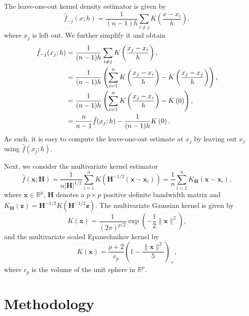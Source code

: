 \documentclass[11pt,a4paper,]{article}
\theoremstyle{definition}
\theoremstyle{definition}
\theoremstyle{definition}
\theoremstyle{remark}
\begin{document}
The leave-one-out kernel density estimator is given by
\begin{equation}\label{eq:kde9}
    \hat{f}_{-j}(x;h) = \frac{1}{(n-1)h}\sum_{i \neq j} K\left(\frac{x-x_i}{h}\right) ,
\end{equation}
where \(x_j\) is left out. We further simplify it and obtain
\begin{align}\label{eq:kde10}
    \hat{f}_{-j}(x_j;h)
      & = \frac{1}{(n-1)h}\sum_{i \neq j} K\left(\frac{x_j-x_i}{h}\right) , \notag                                                  \\
      & = \frac{1}{(n-1)h} \left(\sum_{i = 1}^n K\left(\frac{x_j-x_i}{h}\right) - K\left(\frac{x_j-x_j}{h}\right) \right)  , \notag \\
      & = \frac{1}{(n-1)h} \left(\sum_{i = 1}^n K\left(\frac{x_j-x_i}{h}\right) - K\left(0\right) \right)  , \notag                 \\
      & = \frac{n}{n-1} \hat{f}(x_j;h) - \frac{1}{(n-1)h} K\left(0\right)  .
\end{align}
As such, it is easy to compute the leave-one-out estimate at \(x_j\) by leaving out \(x_j\) using \(\hat{f}(x_j;h)\).

Next, we consider the multivariate kernel estimator
\begin{equation}\label{eq:kde6}
    \hat{f}\left(\bm{x}; \bm{H}\right) = \frac{1}{n|\bm{H}|^{1/2}} \sum_{i=1}^n K\left(\bm{H}^{-1/2}(\bm{x} -\bm{x}_i) \right) = \frac{1}{n} \sum_{i=1}^n K_{\bm{H}}\left(\bm{x} -\bm{x}_i \right) ,
\end{equation}
where \(\mathbf{x} \in \mathbb{R}^p\), \(\bm{H}\) denotes a \(p \times p\) positive definite bandwidth matrix and \(K_{\bm{H}}(\bm{z}) = \bm{H}^{-1/2} K(\bm{H}^{-1/2} \bm{z})\). The multivariate Gaussian kernel is given by
\begin{equation}\label{eq:kde7}
    K(\bm{x}) = \frac{1}{(2\pi)^{p/2}} \exp\left( -\frac{1}{2} \| \bm{x} \| ^2\right) ,
\end{equation}
and the multivariate scaled Epanechnikov kernel by
\begin{equation}\label{eq:kde8}
    K(\bm{x}) = \frac{p+2}{c_p}\left(1 - \frac{\| \bm{x} \| ^2}{5} \right)_+  ,
\end{equation}
where \(c_p\) is the volume of the unit sphere in \(\mathbb{R}^p\).

\hypertarget{sec:lookout}{%
\section{Methodology}\label{sec:lookout}}
\end{document}
